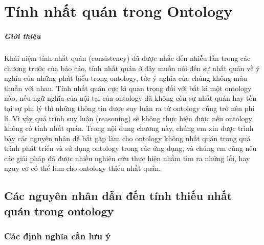 \chapter{Tính nhất quán trong Ontology}
\paragraph{Giới thiệu} Khái niệm tính nhất quán (consistency) đã được nhắc đến nhiều lần trong các chương trước của báo cáo, tính nhất quán ở đây muốn nói đến sự nhất quán về ý nghĩa của những phát biểu trong ontology, tức ý nghĩa của chúng không mâu thuẫn với nhau. Tính nhất quán cực kì quan trọng đối với bất kì một ontology nào, nếu ngữ nghĩa của nội tại của ontology đã không còn sự nhất quán hay tồn tại sự phi lý thì những thông tin được suy luận ra từ ontology cũng trở nên phi lí. Vì vậy quá trình suy luận (reasoning) sẽ không thực hiện được nếu ontology không có tính nhất quán. Trong nội dung chương này, chúng em xin được trình bày các nguyên nhân dễ bắt gặp làm cho ontology không nhất quán trong quá trình phát triển và sử dụng ontology trong các ứng dụng, và chúng em cũng nêu các giải pháp đã được nhiều nghiên cứu thực hiện nhằm tìm ra những lỗi, hay nguy cơ có thể làm cho ontology thiếu nhất quán.
\clearpage
\section{Các nguyên nhân dẫn đến tính thiếu nhất quán trong ontology}
\subsection{Các định nghĩa cần lưu ý \cite{satisfy}}
